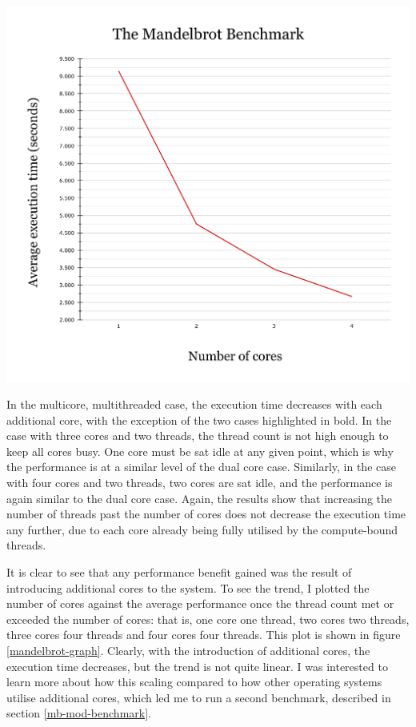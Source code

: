 \documentclass[bsc,frontabs,singlespacing,parskip,deptreport]{infthesis}
\begin{document}
\begin{table}[h]
\begin{minipage}{0.65\textwidth}
    \includegraphics[scale=0.3]{figures/mandelbrot-graph.pdf}
    \label{mandelbrot-graph}
\end{minipage}
\end{table}


In the multicore, multithreaded case, the execution time decreases with each additional core, with the exception of the two cases highlighted in bold. In the case with three cores and two threads, the thread count is not high enough to keep all cores busy. One core must be sat idle at any given point, which is why the performance is at a similar level of the dual core case. Similarly, in the case with four cores and two threads, two cores are sat idle, and the performance is again similar to the dual core case. Again, the results show that increasing the number of threads past the number of cores does not decrease the execution time any further, due to each core already being fully utilised by the compute-bound threads.



It is clear to see that any performance benefit gained was the result of introducing additional cores to the system. To see the trend, I plotted the number of cores against the average performance once the thread count met or exceeded the number of cores: that is, one core one thread, two cores two threads, three cores four threads and four cores four threads. This plot is shown in figure \ref{mandelbrot-graph}. Clearly, with the introduction of additional cores, the execution time decreases, but the trend is not quite linear. I was interested to learn more about how this scaling compared to how other operating systems utilise additional cores, which led me to run a second benchmark, described in section \ref{mb-mod-benchmark}.
\end{document}
